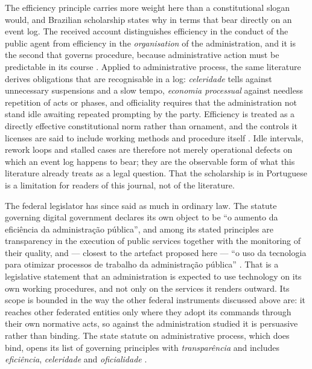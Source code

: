 The efficiency principle carries more weight here than a constitutional slogan would, and
Brazilian scholarship states why in terms that bear directly on an event log. The received
account distinguishes efficiency in the conduct of the public agent from efficiency in the
\emph{organisation} of the administration, and it is the second that governs procedure,
because administrative action must be predictable in its course
\citep{brchicoski2004eficiencia}. Applied to administrative process, the same literature
derives obligations that are recognisable in a log: \emph{celeridade} tells against
unnecessary suspensions and a slow tempo, \emph{economia processual} against needless
repetition of acts or phases, and officiality requires that the administration not stand
idle awaiting repeated prompting by the party. Efficiency is treated as a directly effective
constitutional norm rather than ornament, and the controls it licenses are said to include
working methods and procedure itself \citep{brgabardo2017eficiencia, brfranca2000eficiencia}.
Idle intervals, rework loops and stalled cases are therefore not merely operational
defects on which an event log happens to bear; they are the observable form of what this
literature already treats as a legal question. That the scholarship is in Portuguese is a
limitation for readers of this journal, not of the literature.

The federal legislator has since said as much in ordinary law. The statute governing digital
government declares its own object to be ``o aumento da eficiência da administração pública'',
and among its stated principles are transparency in the execution of public services together
with the monitoring of their quality, and --- closest to the artefact proposed here --- ``o uso
da tecnologia para otimizar processos de trabalho da administração pública''
\citep{brasil2021govdigital}. That is a legislative statement that an administration is
expected to use technology on its own working procedures, and not only on the services it
renders outward. Its scope is bounded in the way the other federal instruments discussed above
are: it reaches other federated entities only where they adopt its commands through their own
normative acts, so against the administration studied it is persuasive rather than binding. The
state statute on administrative process, which does bind, opens its list of governing principles
with \emph{transparência} and includes \emph{eficiência}, \emph{celeridade} and
\emph{oficialidade} \citep{state2016procedurelaw}.

